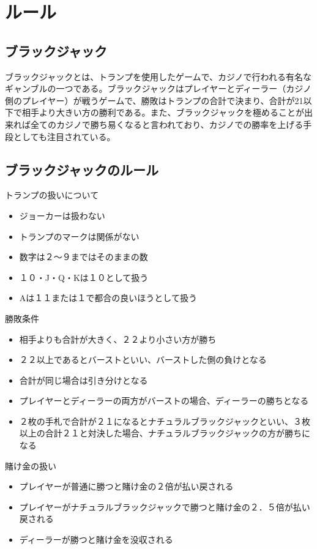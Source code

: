 \section{ルール}
\subsection{ブラックジャック}
ブラックジャックとは、トランプを使用したゲームで、カジノで行われる有名なギャンブルの一つである。ブラックジャックはプレイヤーとディーラー（カジノ側のプレイヤー）が戦うゲームで、勝敗はトランプの合計で決まり、合計が21以下で相手より大きい方の勝利である。また、ブラックジャックを極めることが出来れば全てのカジノで勝ち易くなると言われており、カジノでの勝率を上げる手段としても注目されている。

\subsection{ブラックジャックのルール}
トランプの扱いについて
\begin{itemize}
\item ジョーカーは扱わない
\item トランプのマークは関係がない
\item 数字は２～９まではそのままの数
\item １０・J・Q・Kは１０として扱う
\item Aは１１または１で都合の良いほうとして扱う
\end{itemize}
勝敗条件
\begin{itemize}
\item 相手よりも合計が大きく、２２より小さい方が勝ち
\item ２２以上であるとバーストといい、バーストした側の負けとなる
\item 合計が同じ場合は引き分けとなる
\item プレイヤーとディーラーの両方がバーストの場合、ディーラーの勝ちとなる
\item ２枚の手札で合計が２１になるとナチュラルブラックジャックといい、３枚以上の合計２１と対決した場合、ナチュラルブラックジャックの方が勝ちになる
\end{itemize}
賭け金の扱い
\begin{itemize}
\item プレイヤーが普通に勝つと賭け金の２倍が払い戻される
\item プレイヤーがナチュラルブラックジャックで勝つと賭け金の２．５倍が払い戻される
\item ディーラーが勝つと賭け金を没収される
\end{itemize}
